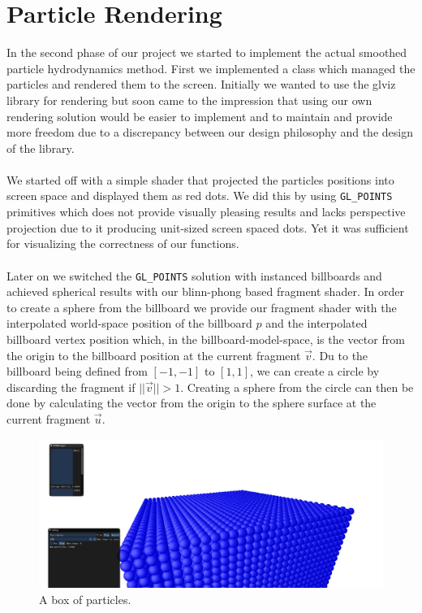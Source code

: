 \documentclass{ACGSeminar}
\begin{document}
\section{Particle Rendering}
In the second phase of our project we started to implement the actual smoothed particle hydrodynamics method. First we implemented a class which managed the particles and rendered them to the screen. Initially we wanted to use the glviz library for rendering but soon came to the impression that using our own rendering solution would be easier to implement and to maintain and provide more freedom due to a discrepancy between our design philosophy and the design of the library. \\
\\
We started off with a simple shader that projected the particles positions into screen space and displayed them as red dots. We did this by using \verb|GL_POINTS| primitives which does not provide visually pleasing results and lacks perspective projection due to it producing unit-sized screen spaced dots. Yet it was sufficient for visualizing the correctness of our functions. \\
\\
Later on we switched the \verb|GL_POINTS| solution with instanced billboards and achieved spherical results with our blinn-phong based fragment shader. In order to create a sphere from the billboard we provide our fragment shader with the interpolated world-space position of the billboard \(p\) and the interpolated billboard vertex position which, in the billboard-model-space, is the vector from the origin to the billboard position at the current fragment \(\vec{v}\). Du to the billboard being defined from \([-1, -1]\) to \([1, 1]\), we can create a circle by discarding the fragment if \(||\vec{v}|| > 1\). Creating a sphere from the circle can then be done by calculating the vector from the origin to the sphere surface at the current fragment \(\vec{u}\).
\begin{figure}[b!]
  \begin{centering}
    \includegraphics[width=15cm]{figures/Particles.png}\par
  \end{centering}
  \caption{A box of particles.}
  \label{fig:particle_shader}
\end{figure}
\end{document}
